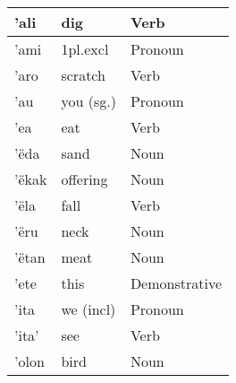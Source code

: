 \documentclass{article}
\begin{document}
\begin{longtable}{|l|l|l|}
'ali                    & dig                 & {\color[HTML]{009901} Verb}                        \\ \hline
'ami                    & 1pl.excl            & {\color[HTML]{009901} Pronoun}                     \\ \hline
'aro                    & scratch             & {\color[HTML]{009901} Verb}                        \\ \hline
'au                     & you (sg.)           & {\color[HTML]{009901} Pronoun}                     \\ \hline
'ea                     & eat                 & {\color[HTML]{009901} Verb}                        \\ \hline
'ëda                    & sand                & {\color[HTML]{009901} Noun}                        \\ \hline
'ëkak                   & offering            & {\color[HTML]{009901} Noun}                        \\ \hline
'ëla                    & fall                & {\color[HTML]{009901} Verb}                        \\ \hline
'ëru                    & neck                & {\color[HTML]{009901} Noun}                        \\ \hline
'ëtan                   & meat                & {\color[HTML]{009901} Noun}                        \\ \hline
'ete                    & this                & {\color[HTML]{009901} Demonstrative}               \\ \hline
'ita                    & we (incl)           & {\color[HTML]{009901} Pronoun}                     \\ \hline
'ita'                   & see                 & {\color[HTML]{009901} Verb}                        \\ \hline
'olon                   & bird                & {\color[HTML]{009901} Noun}                        \\ \hline
\end{longtable}
\end{document}
